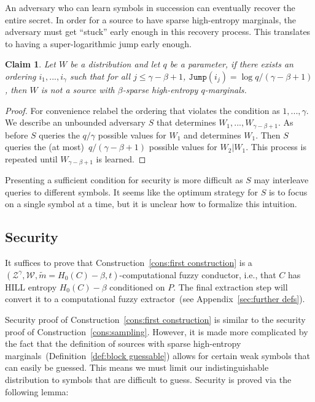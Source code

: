 \documentclass[11pt]{article}
\newtheorem{claim}[theorem]{Claim}
\newcommand{\apref}[1]{\mbox{Appendix~\ref{#1}}}
\newcommand{\defref}[1]{\mbox{Definition~\ref{#1}}}
\newcommand{\consref}[1]{\mbox{Construction~\ref{#1}}}
\begin{document}
An adversary who can learn symbols in succession  can eventually recover the entire secret.  In order for a source to have sparse high-entropy marginals, the adversary must get ``stuck'' early enough in this recovery process.  This translates to having a super-logarithmic jump early enough.

\begin{claim}
Let $W$ be a distribution and let $q$ be a parameter, if there exists an ordering $i_1,..., i_\gamma$ such that for all $j\le \gamma-\beta +1$, $\mathtt{Jump}(i_j) = \log q /(\gamma-\beta+1)$, then $W$ is not a  source with $\beta$-sparse high-entropy $q$-marginals.
\end{claim}

\begin{proof}
For convenience relabel the ordering that violates the condition as $1,..., \gamma$.  We describe an unbounded adversary $S$ that determines $W_1,..., W_{\gamma-\beta+1}$.  As before $S$ queries the $q /\gamma$ possible values for $W_1$ and determines $W_1$.  Then $S$ queries the (at most)~$q/(\gamma-\beta+1)$ possible values for $W_2 | W_1$.  This process is repeated until $W_{\gamma-\beta+1}$ is learned.
\end{proof}

Presenting a sufficient condition for security is more difficult as $S$ may interleave queries to different symbols.  It seems like the optimum strategy for $S$ is to focus on a single symbol at a time, but it is unclear how to formalize this intuition.


\subsection{Security}
It suffices to prove that \consref{cons:first construction} is a  $(\mathcal{Z}^\gamma, \mathcal{W}, \tilde{m}=H_0(C)-\beta, t)$-computational fuzzy conductor, i.e., that $C$ has HILL entropy $H_0(C)-\beta$ conditioned on $P$. The final extraction step will convert it to a computational fuzzy extractor~(see \apref{sec:further defs}).


Security proof of \consref{cons:first construction} is similar to the security proof of \consref{cons:sampling}.  However, it is made more complicated by the fact that the definition of sources with sparse high-entropy marginals~(\defref{def:block guessable}) allows for certain weak symbols that can easily be guessed.  This means we must limit our indistinguishable distribution to symbols that are difficult to guess.  Security is proved via the following lemma:
\end{document}
